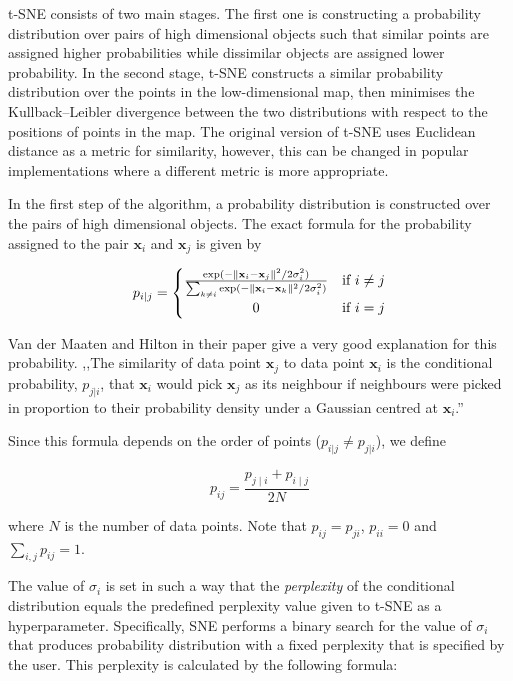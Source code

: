 t-SNE consists of two main stages. The first one is constructing a probability distribution over pairs of high dimensional objects such that similar points are assigned higher probabilities while dissimilar objects are assigned lower probability. In the second stage, t-SNE constructs a similar probability distribution over the points in the low-dimensional map, then minimises the  Kullback–Leibler divergence\cite{bib:kldiv} between the two distributions with respect to the positions of points in the map. The original version of t-SNE uses Euclidean distance as a metric for similarity, however, this can be changed in popular implementations where a different metric is more appropriate.

In the first step of the algorithm, a probability distribution is constructed over the pairs of high dimensional objects. The exact formula for the probability assigned to the pair $\mathbf{x}_i$ and $\mathbf{x}_j$ is given by

\begin{equation}
	\label{eq:tsne:pi|j}
	p_{i|j} =
	\begin{cases}
		{\frac {\exp(-\lVert \mathbf {x} _{i}-\mathbf {x} _{j}\rVert ^{2}/2\sigma _{i}^{2})}{\sum _{k\neq i}\exp(-\lVert \mathbf {x} _{i}-\mathbf {x} _{k}\rVert ^{2}/2\sigma _{i}^{2})}} & \textrm{if } i \neq j \\
		\hfil 0 & \textrm{if } i = j
	\end{cases}
\end{equation}

Van der Maaten and Hilton in their paper\cite{bib:tsne} give a very good explanation for this probability. ,,The similarity of data point $\mathbf{x}_j$ to data point $\mathbf{x}_i$ is the conditional probability, $p_{j|i}$, that $\mathbf{x}_i$ would pick $\mathbf{x}_j$ as its neighbour if neighbours were picked in proportion to their probability density under a Gaussian centred at $\mathbf{x}_i$.''

Since this formula depends on the order of points ($p_{i|j} \neq p_{j|i}$), we define

\begin{equation}
	\label{eq:tsne:pij}
	p_{ij}={\frac {p_{j\mid i}+p_{i\mid j}}{2N}}
\end{equation}

where $N$ is the number of data points. Note that $p_{ij} = p_{ji}$, $p_{ii} = 0$ and $\displaystyle\sum_{i, j}p_{ij} = 1$.

The value of $\sigma_{i}$ is set in such a way that the \textit{perplexity} of the conditional distribution equals the predefined perplexity value given to t-SNE as a hyperparameter. Specifically, SNE performs a binary search for the value of $\sigma_{i}$ that produces probability distribution with a fixed perplexity that is specified by the user. This perplexity is calculated by the following formula:


